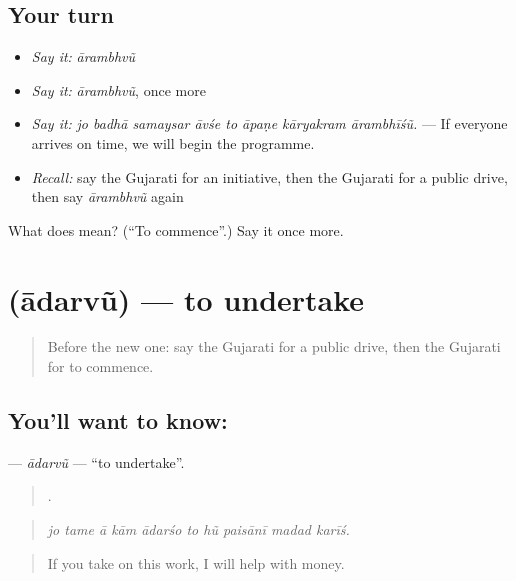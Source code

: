 \subsection*{Your turn}
\begin{itemize}
\raggedright
  \item \emph{Say it:} \emph{ārambhvũ}
  \item \emph{Say it:} \emph{ārambhvũ}, once more
  \item \emph{Say it:} \emph{jo badhā samaysar āvśe to āpaṇe kāryakram ārambhīśũ.} — If everyone arrives on time, we will begin the programme.
  \item \emph{Recall:} say the Gujarati for an initiative, then the Gujarati for a public drive, then say \emph{ārambhvũ} again
\end{itemize}

\begin{tcolorbox}[breakable,colback=teal!4,colframe=teal!35!black,title={Before you move on}]
What does  mean? (\textquotedblleft{}To commence\textquotedblright{}.) Say it once more.
\end{tcolorbox}
\section[\texorpdfstring{\gu{આદરવું} (ādarvũ)}{આદરવું (ādarvũ)}]{ (ādarvũ) — to undertake}

\label{lesson:GU-C388-adarvu}



\begin{quote}
Before the new one: say the Gujarati for a public drive, then the Gujarati for to commence.
\end{quote}

\subsection*{You'll want to know: }
\textbf{} — \emph{ādarvũ} — \textquotedblleft{}to undertake\textquotedblright{}.

\begin{quote}
         .
\end{quote}

\begin{quote}
\emph{jo tame ā kām ādarśo to hũ paisānī madad karīś.}
\end{quote}

\begin{quote}
If you take on this work, I will help with money.
\end{quote}

